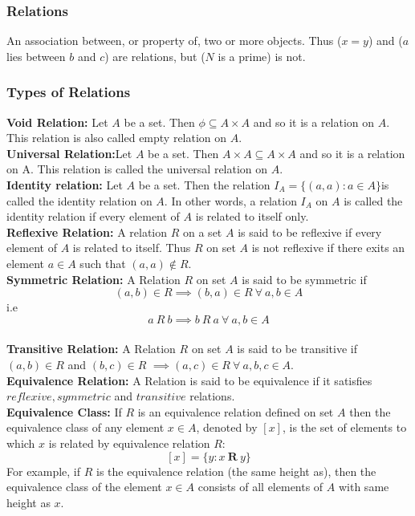 \documentclass[twocolumn, 10pt]{article}
\begin{document}
\subsubsection{Relations}
An association between, or property of, two or more objects. Thus ($x=y$) and ($a$ lies between $b$ and $c$) are relations, but ($N$ is a prime) is not.
\subsubsection{Types of Relations}
\textbf{Void Relation:} Let $A$ be a set. Then $\phi \subseteq A \times A$ and so it is a relation on $A$. This relation is also called empty relation on $A$.\\
\textbf{Universal Relation:}Let $A$ be a set. Then $A\times A \subseteq A \times A$ and so it is a relation on A. This relation is called the universal relation on $A$.\\
\textbf{Identity relation:} Let $A$ be a set. Then the relation $I_A =\{(a,a):a \in A\}$is called the identity relation on $A$. In other words, a relation $I_A$ on $A$ is called the identity relation if every element of $A$ is related to itself only.\\
\textbf{Reflexive Relation:} A relation $R$ on a set $A$ is said to be reflexive if every element of $A$ is related to itself. Thus $R$ on set $A$ is not reflexive if there exits an element $a \in A$ such that $(a,a) \notin R$.\\
\textbf{Symmetric Relation:} A Relation $R$ on set $A$ is said to be symmetric if $$(a,b) \in R \implies (b,a) \in R \medspace \forall \medspace a,b \in A$$ i.e $$a \medspace R \medspace b \implies b \medspace R \medspace a \medspace \forall \medspace a,b \in A$$\\
\textbf{Transitive Relation:} A Relation $R$ on set $A$ is said to be transitive  if $(a,b) \in R$ and $(b,c) \in R$ $\implies (a,c) \in R \medspace \forall \medspace a,b,c \in A$.\\
\textbf{Equivalence Relation:} A Relation is said to be equivalence if it satisfies $reflexive,symmetric$ and $transitive$ relations.\\
\textbf{Equivalence Class:} If $R$ is an equivalence relation defined on set $A$ then the equivalence class of any element $x \in A$, denoted by $[x]$, is the set of elements to which $x$ is related by equivalence relation $R$: $$[x]=\{y:x \medspace \mathbf{R} \medspace y\}$$ For example, if $R$ is the equivalence relation (the same height as), then the equivalence class of the element $x \in A$ consists of all elements of $A$ with same height as $x$.
\end{document}
